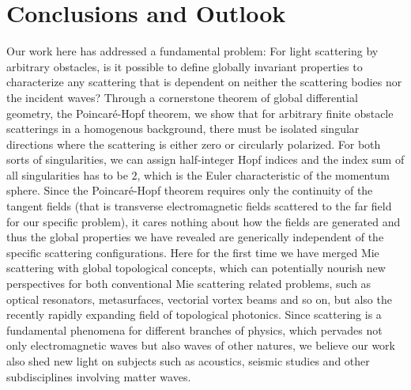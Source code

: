 \documentclass[aps,twocolumn,superscriptaddress]{revtex4-1}
\begin{document}
\section{Conclusions and Outlook}

Our work here has addressed a fundamental problem: For light scattering by arbitrary obstacles, is it possible to define globally invariant properties to characterize any scattering that is dependent on neither the scattering bodies nor the incident waves? Through a cornerstone theorem of global differential geometry, the Poincar\'{e}-Hopf theorem, we show that for arbitrary finite obstacle scatterings in a homogenous background, there must be isolated singular directions where the scattering is either zero or circularly polarized. For both sorts of singularities, we can assign half-integer Hopf indices and the index sum of all singularities has to be $2$, which is the Euler characteristic of the momentum sphere. Since the Poincar\'{e}-Hopf theorem requires only the continuity of the tangent fields (that is transverse electromagnetic fields scattered to the far field for our specific problem), it cares nothing about how the fields are generated and thus the global properties we have revealed are generically independent of the specific scattering configurations. Here for the first time we have merged Mie scattering with global topological concepts, which can potentially nourish new perspectives for both conventional Mie scattering related problems, such as optical resonators, metasurfaces, vectorial vortex beams and so on,  but also the recently rapidly expanding field of topological photonics. Since scattering is a fundamental phenomena for different branches of physics, which pervades not only electromagnetic waves but also waves of other natures,  we believe our work also shed new light on subjects such as acoustics, seismic studies and other subdisciplines involving matter waves.
\end{document}
